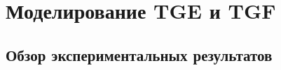 \chapter{Моделирование TGE и TGF
}\label{ch:thunderstorm}

\section{Обзор экспериментальных результатов
}\label{sec:thunderstorm/review-exp}




